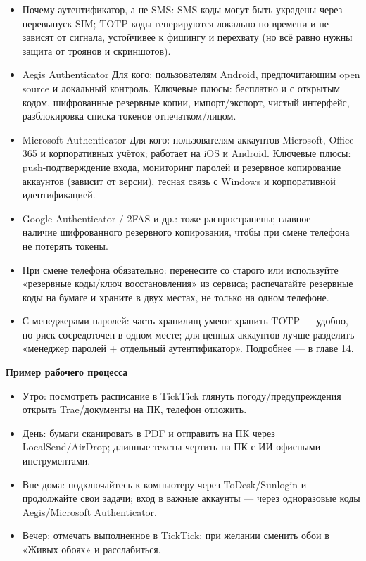 \begin{itemize}
  \item Почему аутентификатор, а не SMS: SMS-коды могут быть украдены через перевыпуск SIM; TOTP-коды генерируются локально по времени и не зависят от сигнала, устойчивее к фишингу и перехвату (но всё равно нужны защита от троянов и скриншотов).
  \item Aegis Authenticator Для кого: пользователям Android, предпочитающим open source и локальный контроль. Ключевые плюсы: бесплатно и с открытым кодом, шифрованные резервные копии, импорт/экспорт, чистый интерфейс, разблокировка списка токенов отпечатком/лицом.
  \item Microsoft Authenticator Для кого: пользователям аккаунтов Microsoft, Office 365 и корпоративных учёток; работает на iOS и Android. Ключевые плюсы: push-подтверждение входа, мониторинг паролей и резервное копирование аккаунтов (зависит от версии), тесная связь с Windows и корпоративной идентификацией.
  \item Google Authenticator / 2FAS и др.: тоже распространены; главное — наличие шифрованного резервного копирования, чтобы при смене телефона не потерять токены.
  \item При смене телефона обязательно: перенесите со старого или используйте «резервные коды/ключ восстановления» из сервиса; распечатайте резервные коды на бумаге и храните в двух местах, не только на одном телефоне.
  \item С менеджерами паролей: часть хранилищ умеют хранить TOTP — удобно, но риск сосредоточен в одном месте; для ценных аккаунтов лучше разделить «менеджер паролей + отдельный аутентификатор». Подробнее — в главе 14.
\end{itemize}


\textbf{Пример рабочего процесса}\par

\begin{itemize}
  \item Утро: посмотреть расписание в TickTick глянуть погоду/предупреждения открыть Trae/документы на ПК, телефон отложить.
  \item День: бумаги сканировать в PDF и отправить на ПК через LocalSend/AirDrop; длинные тексты чертить на ПК с ИИ-офисными инструментами.
  \item Вне дома: подключайтесь к компьютеру через ToDesk/Sunlogin и продолжайте свои задачи; вход в важные аккаунты — через одноразовые коды Aegis/Microsoft Authenticator.
  \item Вечер: отмечать выполненное в TickTick; при желании сменить обои в «Живых обоях» и расслабиться.
\end{itemize}

